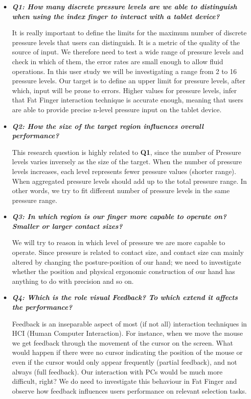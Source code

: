 \begin{itemize}
    \item \emph{\textbf{Q1: How many discrete pressure levels are we able to distinguish when using the index finger to interact with a tablet device?}}

    It is really important to define the limits for the maximum number of discrete pressure levels that users can distinguish. It is a metric of the quality of the source of input. We therefore need to test a wide range of pressure levels and check in which of them, the error rates are small enough to allow fluid operations. In this user study we will be investigating a range from 2 to 16 pressure levels. 
    Our target is to define an upper limit for pressure levels, after which, input will be prone to errors. Higher values for pressure levels, infer that Fat Finger interaction technique is accurate enough, meaning that users are able to provide precise n-level pressure input on the tablet device.

    \item \emph{\textbf{Q2: How the size of the target region influences overall performance?}}

    This research question is highly related to \textbf{Q1}, since the number of Pressure levels varies inversely as the size of the target. When the number of pressure levels increases, each level represents fewer pressure values (shorter range). When aggregated pressure levels should add up to the total pressure range. In other words, we try to fit different number of pressure levels in the same pressure range.

    \item \emph{\textbf{Q3: In which region is our finger more capable to operate on? Smaller or larger contact sizes?}}

    We will try to reason in which level of pressure we are more capable to operate. Since pressure is related to contact size, and contact size can mainly altered by changing the posture-position of our hand; we need to investigate whether the position and physical ergonomic construction of our hand has anything to do with precision and so on.

    \item \emph{\textbf{Q4: Which is the role visual Feedback? To which extend it affects the performance?}}

    Feedback is an inseparable aspect of most (if not all) interaction techniques in HCI (Human Computer Interaction). For instance, when we move the mouse we get feedback through the movement of the cursor on the screen. What would happen if there were no cursor indicating the position of the mouse or even if the cursor would only appear frequently (partial feedback), and not always (full feedback). Our interaction with PCs would be much more difficult, right?
    We do need to investigate this behaviour in Fat Finger and observe how feedback influences users performance on relevant selection tasks.



\end{itemize}
